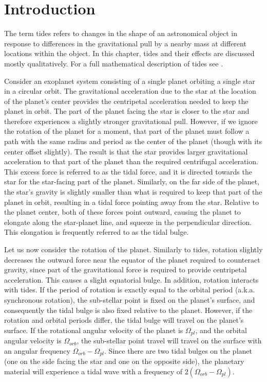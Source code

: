 \section{Introduction}
%
\label{sec:introduction}

The term tides refers to changes in the shape of an astronomical object in
response to differences in the gravitational pull by a nearby mass at different
locations within the object. In this chapter, tides and their effects are
discussed mostly qualitatively. For a full mathematical description of tides see
\cite{Murray_Dermott_book}.

Consider an exoplanet system consisting of a single planet orbiting a single
star in a circular orbit. The gravitational acceleration due to the star at the
location of the planet's center provides the centripetal acceleration needed to
keep the planet in orbit. The part of the planet facing the star is closer to
the star and therefore experiences a slightly stronger gravitational pull.
However, if we ignore the rotation of the planet for a moment, that part of the
planet must follow a path with the same radius and period as the center of the
planet (though with its center offset slightly). The result is that the star
provides larger gravitational acceleration to that part of the planet than the
required centrifugal acceleration. This excess force is referred to as the tidal
force, and it is directed towards the star for the star-facing part of the
planet. Similarly, on the far side of the planet, the star's gravity is slightly
smaller than what is required to keep that part of the planet in orbit,
resulting in a tidal force pointing away from the star. Relative to the planet
center, both of these forces point outward, causing the planet to elongate along
the star-planet line, and squeeze in the perpendicular direction. This
elongation is frequently referred to as the tidal bulge.

Let us now consider the rotation of the planet. Similarly to tides, rotation
slightly decreases the outward force near the equator of the planet required to
counteract gravity, since part of the gravitational force is required to provide
centripetal acceleration. This causes a slight equatorial bulge. In addition,
rotation interacts with tides. If the period of rotation is exactly equal to the
orbital period (a.k.a. synchronous rotation), the sub-stellar point is fixed on
the planet's surface, and consequently the tidal bulge is also fixed relative to
the planet. However, if the rotation and orbital periods differ, the tidal bulge
will travel on the planet's surface. If the rotational angular velocity of the
planet is $\Omega_{pl}$, and the orbital angular velocity is $\Omega_{orb}$,
the sub-stellar point travel will travel on the surface with an angular
frequency $\Omega_{orb} - \Omega_{pl}$. Since there are two tidal bulges on the
planet (one on the side facing the star and one on the opposite side), the
planetary material will experience a tidal wave with a frequency of
$2(\Omega_{orb} - \Omega_{pl})$.

